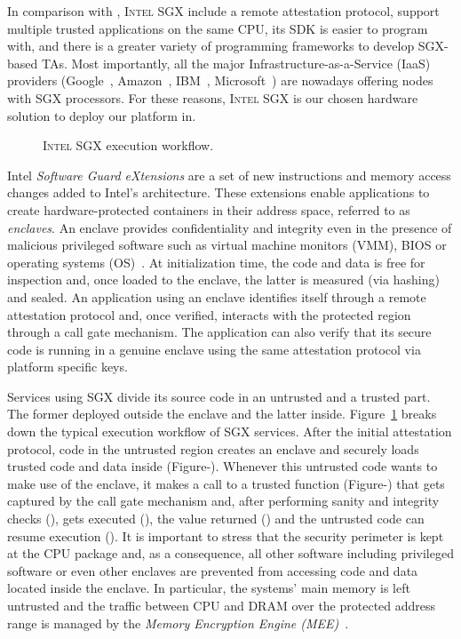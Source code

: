 In comparison with \arm \tz, \textsc{Intel SGX} include a remote attestation protocol, support multiple trusted applications on the same CPU, its SDK is easier to program with, and there is a greater variety of programming frameworks to develop SGX-based TAs.
Most importantly, all the major Infrastructure-as-a-Service (IaaS) providers (Google~\cite{gceskylake}, Amazon~\cite{amazonskylake}, IBM~\cite{ibm-sgx}, Microsoft~\cite{azureconfidential}) are nowadays offering nodes with SGX processors.
For these reasons, \textsc{Intel SGX} is our chosen hardware solution to deploy our platform in.
\begin{figure}
    \centering
    
    \caption{\textsc{Intel SGX} execution workflow.\label{fig:sgx-principles}}
\end{figure}
Intel \textit{Software Guard eXtensions} are a set of new instructions and memory access changes added to Intel's architecture.
These extensions enable applications to create hardware-protected containers in their address space, referred to as \emph{enclaves}.
An enclave provides confidentiality and integrity even in the presence of malicious privileged software such as virtual machine monitors (VMM), BIOS or operating systems (OS)~\cite{McKeen2013}. 
At initialization time, the code and data is free for inspection and, once loaded to the enclave, the latter is measured (via hashing) and sealed. 
An application using an enclave identifies itself through a remote attestation protocol and, once verified, interacts with the protected region through a call gate mechanism.
The application can also verify that its secure code is running in a genuine enclave using the same attestation protocol via platform specific keys. %

Services using SGX divide its source code in an untrusted and a trusted part.
The former deployed outside the enclave and the latter inside.
Figure~\ref{fig:sgx-principles} breaks down the typical execution workflow of SGX services.
After the initial attestation protocol, code in the untrusted region creates an enclave and securely loads trusted code and data inside (Figure-). 
Whenever this untrusted code wants to make use of the enclave, it makes a call to a trusted function (Figure-) that gets captured by the call gate mechanism and, after performing sanity and integrity checks (), gets executed (), the value returned () and the untrusted code can resume execution ().
It is important to stress that the security perimeter is kept at the CPU package and, as a consequence, all other software including privileged software or even other enclaves are prevented from accessing code and data located inside the enclave. 
In particular, the systems' main memory is left untrusted and the traffic between CPU and DRAM over the protected address range is managed by the \textit{Memory Encryption Engine (MEE)}~\cite{Gueron16}.

